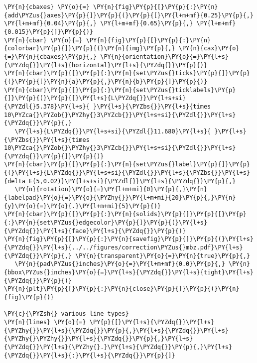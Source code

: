 \begin{Verbatim}[commandchars=\\\{\}]
\PY{n}{cbaxes} \PY{o}{=} \PY{n}{fig}\PY{p}{[}\PY{p}{:}\PY{n}{add\PYZus{}axes}\PY{p}{]}\PY{p}{(}\PY{p}{[}\PY{l+m+mf}{0.25}\PY{p}{,} \PY{l+m+mf}{0.04}\PY{p}{,} \PY{l+m+mf}{0.65}\PY{p}{,} \PY{l+m+mf}{0.015}\PY{p}{]}\PY{p}{)}
\PY{n}{cbar} \PY{o}{=} \PY{n}{fig}\PY{p}{[}\PY{p}{:}\PY{n}{colorbar}\PY{p}{]}\PY{p}{(}\PY{n}{img}\PY{p}{,} \PY{n}{cax}\PY{o}{=}\PY{n}{cbaxes}\PY{p}{,} \PY{n}{orientation}\PY{o}{=}\PY{l+s}{\PYZdq{}}\PY{l+s}{horizontal}\PY{l+s}{\PYZdq{}}\PY{p}{)}
\PY{n}{cbar}\PY{p}{[}\PY{p}{:}\PY{n}{set\PYZus{}ticks}\PY{p}{]}\PY{p}{(}\PY{p}{[}\PY{n}{a}\PY{p}{,}\PY{n}{b}\PY{p}{]}\PY{p}{)}
\PY{n}{cbar}\PY{p}{[}\PY{p}{:}\PY{n}{set\PYZus{}ticklabels}\PY{p}{]}\PY{p}{(}\PY{p}{[}\PY{l+s}{L\PYZdq{}}\PY{l+s+si}{\PYZdl{}5.378}\PY{l+s}{ }\PY{l+s}{\PYZbs{}}\PY{l+s}{times 10\PYZca{}\PYZob{}\PYZhy{}3\PYZcb{}}\PY{l+s+si}{\PYZdl{}}\PY{l+s}{\PYZdq{}}\PY{p}{,}
   \PY{l+s}{L\PYZdq{}}\PY{l+s+si}{\PYZdl{}11.680}\PY{l+s}{ }\PY{l+s}{\PYZbs{}}\PY{l+s}{times 10\PYZca{}\PYZob{}\PYZhy{}3\PYZcb{}}\PY{l+s+si}{\PYZdl{}}\PY{l+s}{\PYZdq{}}\PY{p}{]}\PY{p}{)}
\PY{n}{cbar}\PY{p}{[}\PY{p}{:}\PY{n}{set\PYZus{}label}\PY{p}{]}\PY{p}{(}\PY{l+s}{L\PYZdq{}}\PY{l+s+si}{\PYZdl{}}\PY{l+s}{\PYZbs{}}\PY{l+s}{delta E(5,0.02)}\PY{l+s+si}{\PYZdl{}}\PY{l+s}{\PYZdq{}}\PY{p}{,}
   \PY{n}{rotation}\PY{o}{=}\PY{l+m+mi}{0}\PY{p}{,}\PY{n}{labelpad}\PY{o}{=}\PY{o}{\PYZhy{}}\PY{l+m+mi}{20}\PY{p}{,}\PY{n}{y}\PY{o}{=}\PY{o}{.}\PY{l+m+mi}{5}\PY{p}{)}
\PY{n}{cbar}\PY{p}{[}\PY{p}{:}\PY{n}{solids}\PY{p}{]}\PY{p}{[}\PY{p}{:}\PY{n}{set\PYZus{}edgecolor}\PY{p}{]}\PY{p}{(}\PY{l+s}{\PYZdq{}}\PY{l+s}{face}\PY{l+s}{\PYZdq{}}\PY{p}{)}
\PY{n}{fig}\PY{p}{[}\PY{p}{:}\PY{n}{savefig}\PY{p}{]}\PY{p}{(}\PY{l+s}{\PYZdq{}}\PY{l+s}{../../figures/correction\PYZus{}mbz.pdf}\PY{l+s}{\PYZdq{}}\PY{p}{,} \PY{n}{transparent}\PY{o}{=}\PY{n}{true}\PY{p}{,}
   \PY{n}{pad\PYZus{}inches}\PY{o}{=}\PY{l+m+mf}{0.0}\PY{p}{,} \PY{n}{bbox\PYZus{}inches}\PY{o}{=}\PY{l+s}{\PYZdq{}}\PY{l+s}{tight}\PY{l+s}{\PYZdq{}}\PY{p}{)}
\PY{n}{plt}\PY{p}{[}\PY{p}{:}\PY{n}{close}\PY{p}{]}\PY{p}{(}\PY{n}{fig}\PY{p}{)}

\PY{c}{\PYZsh{} various line types}
\PY{n}{lines} \PY{o}{=} \PY{p}{[}\PY{l+s}{\PYZdq{}}\PY{l+s}{\PYZhy{}}\PY{l+s}{\PYZdq{}}\PY{p}{,}\PY{l+s}{\PYZdq{}}\PY{l+s}{\PYZhy{}\PYZhy{}}\PY{l+s}{\PYZdq{}}\PY{p}{,}\PY{l+s}{\PYZdq{}}\PY{l+s}{\PYZhy{}.}\PY{l+s}{\PYZdq{}}\PY{p}{,}\PY{l+s}{\PYZdq{}}\PY{l+s}{:}\PY{l+s}{\PYZdq{}}\PY{p}{]}


\end{Verbatim}
